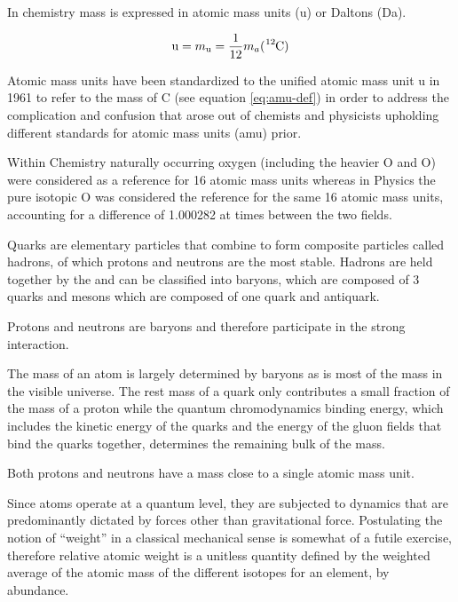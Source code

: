 In chemistry mass is expressed in atomic mass units (\si{\atomicmassunit}) or
Daltons (\si{\dalton}).

\begin{equation}\label{eq:amu-def} \mathrm {u} = m_{\mathrm {u} }=\frac {1}{12}
m_a(\mathrm{ \ce{^{12}}C }) \end{equation}

Atomic mass units have been standardized to the unified
atomic mass unit \si{\atomicmassunit} in 1961 to refer to the mass of
C (see equation \ref{eq:amu-def}) in order to address the complication
and confusion that arose out of chemists and physicists upholding different
standards for atomic mass units (amu) prior.

\begin{tcolorbox}[colback=gray!5!white,colframe=gray!75!black]
Within Chemistry naturally occurring oxygen (including the heavier O and O) were
considered as a reference for 16 atomic mass units whereas in Physics the pure
isotopic O was considered the reference for the same 16 atomic mass
units, accounting for a difference of \num{1.000282} at times between the two
fields.
\end{tcolorbox}

Quarks are elementary particles that combine to form composite
particles called hadrons, of which protons and neutrons are the
most stable.  Hadrons are held together by the  and can be
classified into baryons, which are composed of 3 quarks and
mesons which are composed of one quark and antiquark.

Protons and neutrons are baryons and therefore participate in the strong
interaction.

The mass of an atom is largely determined by baryons as is most of the mass in
the visible universe. The rest mass of a quark only contributes a small fraction
of the mass of a proton while the quantum chromodynamics binding energy, which
includes the kinetic energy of the quarks and the energy of the gluon fields that bind the quarks together, determines the remaining bulk of the mass.

Both protons and neutrons have a mass close to a single atomic mass unit.


Since atoms operate at a quantum level, they are subjected to dynamics that are
predominantly dictated by forces other than gravitational force.  Postulating
the notion of ``weight'' in a classical mechanical sense is somewhat of a futile
exercise, therefore relative atomic weight is a unitless quantity defined by the
weighted average of the atomic mass of the different isotopes for an element, by
abundance.


